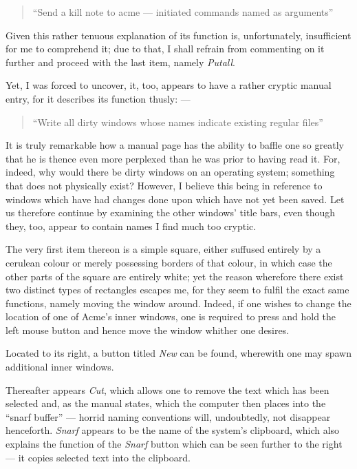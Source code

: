 \documentclass[a5paper,twoside,12pt]{report}
\begin{document}
  \begin{quote}
    ``Send a kill note to acme — initiated commands named as arguments''
  \end{quote}

  Given this rather tenuous explanation of its function is, unfortunately, insufficient for me to comprehend it; due to that, I shall refrain from commenting on it further and proceed with the last item, namely \textit{Putall}.

  Yet, I was forced to uncover, it, too, appears to have a rather cryptic manual entry, for it describes its function thusly: —

  \begin{quote}
    ``Write all dirty windows whose names indicate existing regular files''
  \end{quote}

  It is truly remarkable how a manual page has the ability to baffle one so greatly that he is thence even more perplexed than he was prior to having read it. For, indeed, why would there be dirty windows on an operating system; something that does not physically exist? However, I believe this being in reference to windows which have had changes done upon which have not yet been saved. Let us therefore continue by examining the other windows' title bars, even though they, too, appear to contain names I find much too cryptic.

  The very first item thereon is a simple square, either suffused entirely by a cerulean colour or merely possessing borders of that colour, in which case the other parts of the square are entirely white; yet the reason wherefore there exist two distinct types of rectangles escapes me, for they seem to fulfil the exact same functions, namely moving the window around. Indeed, if one wishes to change the location of one of Acme's inner windows, one is required to press and hold the left mouse button and hence move the window whither one desires. 

  Located to its right, a button titled \textit{New} can be found, wherewith one may spawn additional inner windows.

  Thereafter appears \textit{Cut}, which allows one to remove the text which has been selected and, as the manual states, which the computer then places into the ``snarf buffer'' — horrid naming conventions will, undoubtedly, not disappear henceforth. \textit{Snarf} appears to be the name of the system's clipboard, which also explains the function of the \textit{Snarf} button which can be seen further to the right — it copies selected text into the clipboard.
\end{document}

